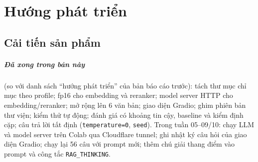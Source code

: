 \chapter{Hướng phát triển}
\label{ch:huong-phat-trien}

\section{Cải tiến sản phẩm}
\label{sec:huong-phat-trien}

\paragraph{Đã xong trong bản này} (so với danh sách ``hướng phát triển'' của bản báo cáo trước):
tách thư mục chỉ mục theo profile; fp16 cho embedding và reranker; model server HTTP cho
embedding/reranker; mở rộng lên 6 văn bản; giao diện Gradio; ghim phiên bản thư viện; kiểm thử tự
động; đánh giá có khoảng tin cậy, baseline và kiểm định cặp; câu trả lời tất định
(\texttt{temperature=0}, \texttt{seed}). Trong tuần 05--09/10: chạy LLM và model server trên Colab qua
Cloudflare tunnel; ghi nhật ký câu hỏi của giao diện Gradio; chạy lại 56 câu với prompt mới; thêm chú
giải thang điểm vào prompt và công tắc \texttt{RAG\_THINKING}.

